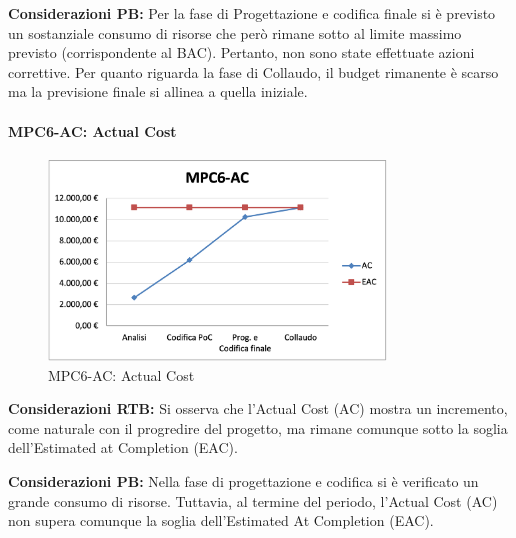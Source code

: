 \vspace{0.5cm}
\noindent \textbf{Considerazioni PB:} 
Per la fase di Progettazione e codifica finale si è previsto un sostanziale consumo di risorse che però rimane sotto al limite massimo previsto (corrispondente al BAC). Pertanto, non sono state effettuate azioni correttive. Per quanto riguarda la fase di Collaudo, il budget rimanente è scarso ma la previsione finale si allinea a quella iniziale. 

\paragraph{MPC6-AC: Actual Cost}
\begin{figure}[h!] 
    \centering
    \includegraphics[width=0.8\textwidth]{images/MPC6-AC.png}
    \caption{MPC6-AC: Actual Cost}
\end{figure}
\noindent \textbf{Considerazioni RTB:} Si osserva che l’Actual Cost (AC) mostra un incremento, come naturale con il progredire del progetto, ma rimane comunque sotto la soglia dell'Estimated at Completion (EAC). 

\vspace{0.5cm}
\noindent \textbf{Considerazioni PB:} Nella fase di progettazione e codifica si è verificato un grande consumo di risorse. Tuttavia, al termine del periodo, l'Actual Cost (AC) non supera comunque la soglia dell'Estimated At Completion (EAC).


